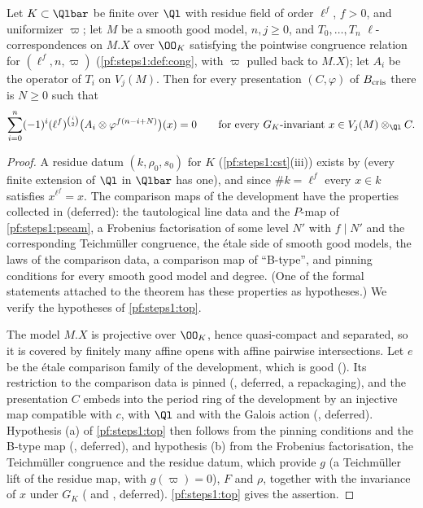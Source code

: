 \begin{theorem}\label{pf:steps1:finall}
Let $K\subset\Qlbar$ be finite over $\Ql$ with residue field of order $\ell^f$, $f>0$, and uniformizer $\varpi$; let $M$
be a smooth good model, $n,j\ge0$, and $T_0,\dots,T_n$ $\ell$-correspondences on $M.X$ over $\OO_K$ satisfying the
pointwise congruence relation for $(\ell^f,n,\varpi)$ (\cref{pf:steps1:def:cong}, with $\varpi$ pulled back to $M.X$); let
$A_i$ be the operator of $T_i$ on
$V_j(M)$. Then for every presentation $(C,\varphi)$ of $B_{\mathrm{cris}}$ there is $N\ge0$ such that
\[
 \sum_{i=0}^n(-1)^i(\ell^f)^{\binom i2}\bigl(A_i\otimes\varphi^{f(n-i+N)}\bigr)(x)=0
 \qquad\text{for every $G_K$-invariant }x\in V_j(M)\otimes_{\Ql}C .
\]
\end{theorem}

\begin{proof}
A residue datum $(k,\rho_0,s_0)$ for $K$ (\cref{pf:steps1:cst}(iii)) exists by 
(every finite extension of $\Ql$ in $\Qlbar$ has one), and since $\#k=\ell^f$ every $x\in k$ satisfies $x^{\ell^f}=x$. The
comparison maps of the development have the properties collected in 
(deferred): the tautological line data and the $P$-map of \cref{pf:steps1:pseam}, a Frobenius factorisation of some level $N'$ with
$f\mid N'$ and the corresponding Teichm\"uller congruence, the \'etale side of smooth good models, the laws of the comparison data, a
comparison map of ``B-type'', and pinning conditions for every smooth good model and degree. (One of the formal statements attached
to the theorem has these properties as hypotheses.) We verify the hypotheses of \cref{pf:steps1:top}.

The model $M.X$ is projective over $\OO_K$, hence quasi-compact and separated, so it is covered by finitely many affine opens with
affine pairwise intersections. Let $e$ be the \'etale comparison family of the development,
which is good (). Its restriction to the comparison data is pinned
(, deferred, a repackaging), and the presentation $C$ embeds into the period ring
of the development by an injective map compatible with $c$, with $\Ql$ and with the Galois action
(, deferred). Hypothesis (a) of \cref{pf:steps1:top} then follows from the
pinning conditions and the B-type map (, deferred), and hypothesis (b) from the
Frobenius factorisation, the Teichm\"uller congruence and the residue datum, which provide $g$ (a Teichm\"uller lift of the residue
map, with $g(\varpi)=0$), $F$ and $\rho$, together with the invariance of $x$ under $G_K$
( and , deferred).
\cref{pf:steps1:top} gives the assertion.
\end{proof}


